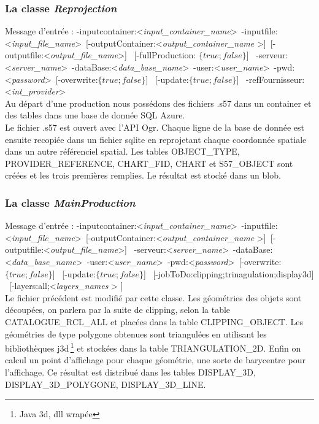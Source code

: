 \subsubsection{La classe \textit{Reprojection}}
Message d'entrée : 
-inputcontainer:\textless \textit{input\_container\_name}\textgreater \   
-inputfile:\textless \textit{input\_file\_name}\textgreater \ 
[-outputContainer:\textless \textit{output\_container\_name} \textgreater ]\  
[-outputfile:\textless \textit{output\_file\_name}\textgreater ] \ 
[-fullProduction: $\{true;false\}$] \ 
-serveur:\textless \textit{server\_name}\textgreater \   
-dataBase:\textless \textit{data\_base\_name}\textgreater \   
-user:\textless \textit{user\_name}\textgreater  \ 
-pwd:\textless \textit{password}\textgreater  \ 
[-overwrite:$\{true;false\}$] \ 
[-update:$\{true;false\}$] \ 
-refFournisseur:\textless \textit{int\_provider}\textgreater \\   

Au départ d'une production nous possédons des fichiers .s57 dans un
container et des tables dans une base de donnée SQL Azure.  \\

Le fichier .s57 est ouvert avec l'API Ogr. Chaque ligne de la base de
donnée est ensuite recopiée dans un fichier sqlite en reprojetant
chaque coordonnée spatiale dans un autre référenciel spatial. Les
tables OBJECT\_TYPE, PROVIDER\_REFERENCE, CHART\_FID, CHART et
S57\_OBJECT sont créées et les trois premières remplies. Le résultat
est stocké dans un blob.


\subsubsection{La classe \textit{MainProduction}}
Message d'entrée : 
-inputcontainer:\textless \textit{input\_container\_name}\textgreater \   
-inputfile:\textless \textit{input\_file\_name}\textgreater \ 
[-outputContainer:\textless \textit{output\_container\_name} \textgreater ]\  
[-outputfile:\textless \textit{output\_file\_name}\textgreater ] \ 
-serveur:\textless \textit{server\_name}\textgreater \   
-dataBase:\textless \textit{data\_base\_name}\textgreater \   
-user:\textless \textit{user\_name}\textgreater  \ 
-pwd:\textless \textit{password}\textgreater  \ 
[-overwrite:$\{true;false\}$] \ 
[-update:$\{true;false\}$] \ 
[-jobToDo:{clipping;trinagulation;display3d}] \ 
[-layers:{all;\textless \textit{layers\_names} \textgreater} ] \\ 

Le fichier précédent est modifié par cette classe. Les géométries des
objets sont découpées, on parlera par la suite de clipping, selon la
table CATALOGUE\_RCL\_ALL et placées dans la table
CLIPPING\_OBJECT. Les géométries de type polygone obtenues sont
triangulées en utilisant les bibliothèques j3d\,\footnote{Java 3d, dll
  wrapée} et stockées dans la table TRIANGULATION\_2D. Enfin on calcul
un point d'affichage pour chaque géométrie, une sorte de barycentre
pour l'affichage. Ce résultat est distribué dans les tables
DISPLAY\_3D, DISPLAY\_3D\_POLYGONE, DISPLAY\_3D\_LINE.




